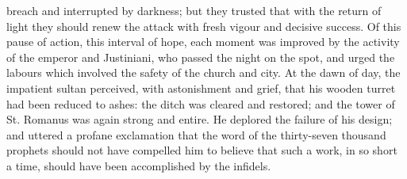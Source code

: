 breach and interrupted by darkness; but they trusted that with the return of light they should renew the attack with fresh vigour and decisive success. Of this pause of action, this interval of hope, each moment was improved by the activity of the emperor and Justiniani, who passed the night on the spot, and urged the labours which involved the safety of the church and city. At the dawn of day, the impatient sultan perceived, with astonishment and grief, that his wooden turret had been reduced to ashes: the ditch was cleared and restored; and the tower of St. Romanus was again strong and entire. He deplored the failure of his design; and uttered a profane exclamation that the word of the thirty-seven thousand prophets should not have compelled him to believe that such a work, in so short a time, should have been accomplished by the infidels.

